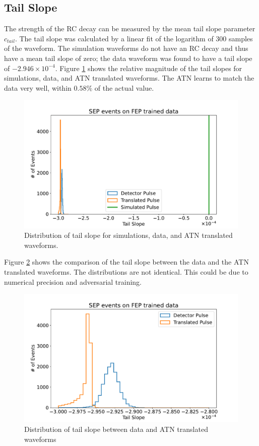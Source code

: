 \subsection{Tail Slope}
The strength of the RC decay can be measured by the mean tail slope parameter $c_{tail}$. The tail slope was calculated by a linear fit of the logarithm of 300 samples of the waveform. The simulation waveforms do not have an RC decay and thus have a mean tail slope of zero; the data waveform was found to have a tail slope of $-2.946\times10^{-4}$.  Figure \ref{ch8_fig_tail_slope_comp} shows the relative magnitude of the tail slopes for simulations, data, and ATN translated waveforms. The ATN learns to match the data very well, within $0.58\%$ of the actual value.


\begin{figure}%
\centering
\includegraphics[width=0.97\linewidth,trim={2pc 0pc 2pc 0pc},clip]{ch8/figs/SEP_sim_ts.pdf}
\caption{Distribution of tail slope for simulations, data, and ATN translated waveforms.}
\label{ch8_fig_tail_slope_comp}
\end{figure}

Figure \ref{ch8_fig_tail_slope_sim} shows the comparison of the tail slope between the data and the ATN translated waveforms. The distributions are not identical. This could be due to numerical precision and adversarial training.

\begin{figure}%
\centering
\includegraphics[width=0.9\linewidth,trim={2pc 0pc 2pc 0pc},clip]{ch8/figs/SEP_ts.pdf}
\caption{Distribution of tail slope between data and ATN translated waveforms}
\label{ch8_fig_tail_slope_sim}
\end{figure}

